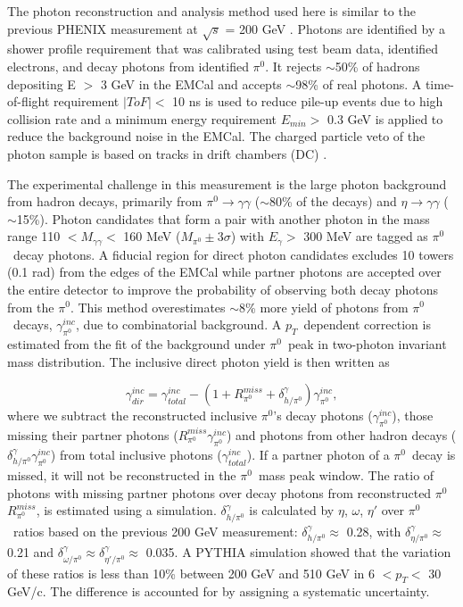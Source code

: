 \documentclass[twocolumn,letterpaper,aps,prl,longbibliography,superscriptaddress,floatfix]{revtex4-2}
\newcommand{\pT}{\ensuremath{p_T}}
\newcommand{\pizero}{\ensuremath{\pi^0}}
\begin{document}
The photon reconstruction and analysis method used here is similar to the previous PHENIX measurement at $\sqrt{s}$ =  200 GeV \cite{PhysRevLett.98.012002,PhysRevD.86.072008}. Photons are identified by a shower profile requirement that was calibrated using test beam data, identified electrons, and decay photons from identified \pizero. It rejects $\sim$50\% of hadrons depositing E $>$ 3 GeV in the EMCal and accepts $\sim$98\% of real photons. A time-of-flight requirement $|ToF| <$ 10 ns is used to reduce pile-up events due to high collision rate and a minimum energy requirement $E_{min} >$ 0.3 GeV is applied to reduce the background noise in the EMCal. The charged particle veto of the photon sample is based on tracks in drift chambers (DC) \cite{ADCOX2003489}. 

The experimental challenge in this measurement is the large photon background from hadron decays, primarily from $\pi^0 \rightarrow \gamma\gamma$ ($\sim$80\% of the decays) and $\eta \rightarrow \gamma\gamma$ ($\sim$15\%). Photon candidates that form a pair with another photon in the mass range 110 $< M_{\gamma\gamma} <$ 160 MeV ($M_{\pi^0} \pm 3\sigma$) with $E_{\gamma} >$ 300 MeV are tagged as \pizero\ decay photons. A fiducial region for direct photon candidates excludes 10 towers (0.1 rad) from the edges of the EMCal while partner photons are accepted over the entire detector to improve the probability of observing both decay photons from the \pizero. This method overestimates $\sim$8\% more yield of photons from \pizero\ decays, $\gamma_{\pi^0}^{inc}$, due to combinatorial background. A \pT\ dependent correction is estimated from the fit of the background under \pizero\ peak in two-photon invariant mass distribution. The inclusive direct photon yield is then written as

\begin{equation} \label{eq:inc}
\gamma_{dir}^{inc} = \gamma_{total}^{inc} - \left( 1 + R_{\pi^0}^{miss} + \delta_{h/\pi^0}^{\gamma} \right) \gamma_{\pi^0}^{inc},
\end{equation}
where we subtract the reconstructed inclusive \pizero's decay photons ($\gamma_{\pi^0}^{inc}$), those missing their partner photons ($R_{\pi^0}^{miss}\gamma_{\pi^0}^{inc}$) and photons from other hadron decays ($\delta_{h/\pi^0}^{\gamma}\gamma_{\pi^0}^{inc}$) from total inclusive photons ($\gamma_{total}^{inc}$). If a partner photon of a \pizero\ decay is missed, it will not be reconstructed in the \pizero\ mass peak window. The ratio of photons with missing partner photons over decay photons from reconstructed \pizero\, $R_{\pi^0}^{miss}$, is estimated using a simulation.
$\delta_{h/\pi^0}^{\gamma}$ is calculated by $\eta$, $\omega$, $\eta'$ over \pizero\ ratios based on the previous 200 GeV measurement\cite{PhysRevD.83.052004}: $\delta_{h/\pi^0}^{\gamma} \approx$ 0.28, with $\delta_{\eta/\pi^0}^{\gamma} \approx$ 0.21 and $\delta_{\omega/\pi^0}^{\gamma} \approx \delta_{\eta'/\pi^0}^{\gamma}  \approx$ 0.035. A PYTHIA \cite{Sjostrand:2006za} simulation showed that the variation of these ratios is less than 10\% between 200 GeV and 510 GeV in 6 $< p_T <$ 30 GeV/c. The difference is accounted for by assigning a systematic uncertainty.
\end{document}

